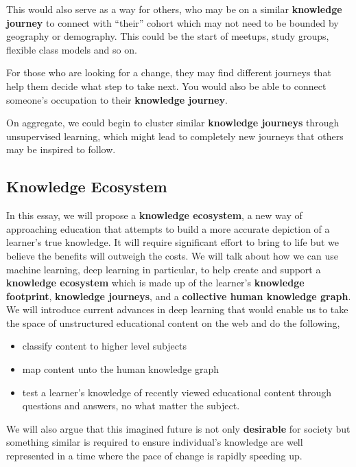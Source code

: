 \documentclass{acm_proc_article-sp}
\begin{document}
This would also serve as a way for others, who may be on a similar
\textbf{knowledge journey} to connect with ``their'' cohort which may
not need to be bounded by geography or demography. This could be the
start of meetups, study groups, flexible class models and so on.

For those who are looking for a change, they may find different journeys
that help them decide what step to take next. You would also be able to
connect someone's occupation to their \textbf{knowledge journey}.

On aggregate, we could begin to cluster similar \textbf{knowledge
journeys} through unsupervised learning, which might lead to completely
new journeys that others may be inspired to follow.

\subsection{Knowledge Ecosystem}\label{knowledge-ecosystem}

In this essay, we will propose a \textbf{knowledge ecosystem}, a new way
of approaching education that attempts to build a more accurate
depiction of a learner's true knowledge. It will require significant
effort to bring to life but we believe the benefits will outweigh the
costs. We will talk about how we can use machine learning, deep learning
in particular, to help create and support a \textbf{knowledge ecosystem}
which is made up of the learner's \textbf{knowledge footprint},
\textbf{knowledge journeys}, and a \textbf{collective human knowledge
graph}. We will introduce current advances in deep learning that would
enable us to take the space of unstructured educational content on the
web and do the following,

\begin{itemize}
\item
  classify content to higher level subjects
\item
  map content unto the human knowledge graph
\item
  test a learner's knowledge of recently viewed educational content
  through questions and answers, no what matter the subject.
\end{itemize}

We will also argue that this imagined future is not only
\textbf{desirable} for society but something similar is required to
ensure individual's knowledge are well represented in a time where the
pace of change is rapidly speeding up.
\end{document}
